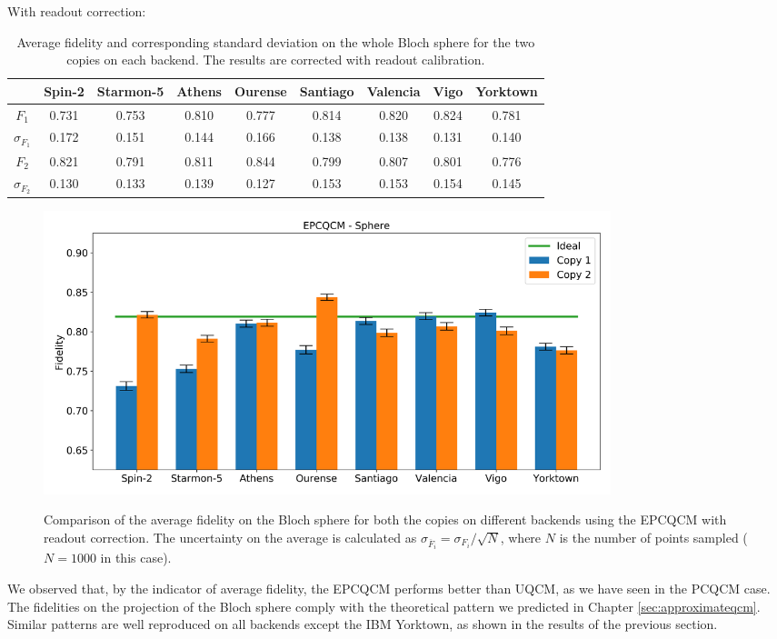 With readout correction:
\begin{table}[H]
    \centering
    \begin{tabular}{|c|c|c|c|c|c|c|c|c|}
    \hline
    \textbf{} & \textbf{Spin-2} & \textbf{Starmon-5} & \textbf{Athens} & \textbf{Ourense} & \textbf{Santiago} & \textbf{Valencia} & \textbf{Vigo} & \textbf{Yorktown} \\ \hline
    $F_1$              & 0.731 & 0.753 & 0.810 & 0.777 & 0.814 & 0.820 & 0.824 & 0.781 \\ \hline
    $\sigma_{F_1}$     & 0.172 & 0.151 & 0.144 & 0.166 & 0.138 & 0.138 & 0.131 & 0.140 \\ \hline
    $F_2$              & 0.821 & 0.791 & 0.811 & 0.844 & 0.799 & 0.807 & 0.801 & 0.776 \\ \hline
    $\sigma_{F_2}$     & 0.130 & 0.133 & 0.139 & 0.127 & 0.153 & 0.153 & 0.154 & 0.145 \\ \hline
    \end{tabular}
    \caption{Average fidelity and corresponding standard deviation on the whole Bloch sphere for the two copies on each backend. The results are corrected with readout calibration.}
    \label{tab:results_epcqcm_fullsphere_corrected}
\end{table}
\begin{figure}[H]
  \centering
          \includegraphics[width=0.8\textwidth]{Figures/Economical/Histograms/histo_sphere_corrected.png}
      \label{fig:epc_histo_sphere_corrected}
      \caption{Comparison of the average fidelity on the Bloch sphere for both the copies on different backends using the EPCQCM with readout correction. The uncertainty on the average is calculated as $\sigma_{\overline{F}_i}=\sigma_{F_i}/\sqrt{N}$, where $N$ is the number of points sampled ($N=1000$ in this case).}
\end{figure}

We observed that, by the indicator of average fidelity, the EPCQCM performs better than UQCM, as we have seen in the PCQCM case. The fidelities on the projection of the Bloch sphere comply with the theoretical pattern we predicted in Chapter \ref{sec:approximateqcm}. Similar patterns are well reproduced on all backends except the IBM Yorktown, as shown in the results of the previous section. 

